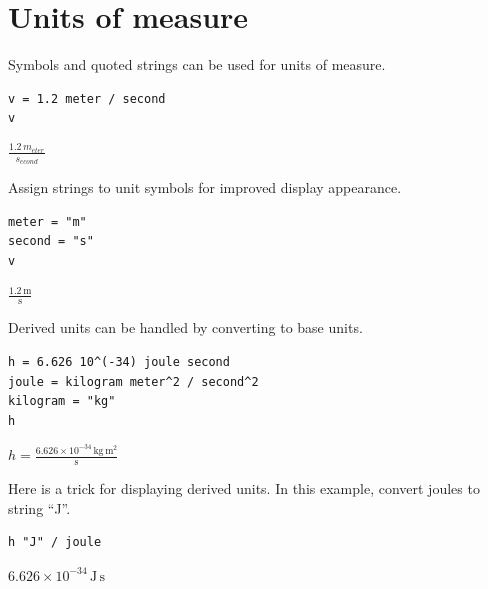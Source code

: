 
\newpage

\section{Units of measure}

Symbols and quoted strings can be used for units of measure.

{\color{blue}
\begin{verbatim}
v = 1.2 meter / second
v
\end{verbatim}}

$\displaystyle\frac{1.2\,m_{eter}}{s_{econd}}$

\bigskip
Assign strings to unit symbols for improved display appearance.

{\color{blue}
\begin{verbatim}
meter = "m"
second = "s"
v
\end{verbatim}}

$\displaystyle\frac{1.2\,\text{m}}{\text{s}}$

\bigskip
Derived units can be handled by converting to base units.

{\color{blue}
\begin{verbatim}
h = 6.626 10^(-34) joule second
joule = kilogram meter^2 / second^2
kilogram = "kg"
h
\end{verbatim}}

$\displaystyle h=\frac{6.626\times10^{-34}\,\text{kg}\,\text{m}^2}{\text{s}}$

\bigskip
Here is a trick for displaying derived units.
In this example, convert joules to string ``J''.

{\color{blue}
\begin{verbatim}
h "J" / joule
\end{verbatim}}

$6.626\times10^{-34}\,\text{J}\,\text{s}$



